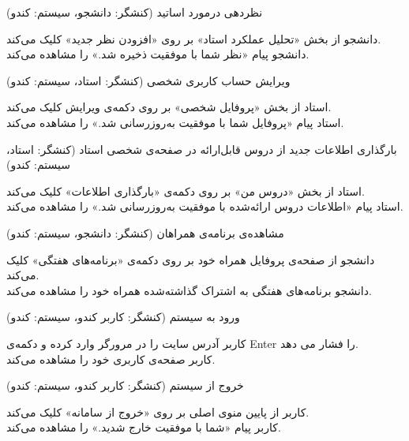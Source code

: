 \documentclass{report}
\begin{document}
\textbf{}
نظردهی درمورد اساتید (کنشگر: دانشجو، سیستم: کندو)
\begin{addmargin}[.84cm]{0cm}
دانشجو از بخش «تحلیل عملکرد استاد» بر روی «افزودن نظر جدید» کلیک می‌کند.\\
دانشجو پیام «نظر شما با موفقیت ذخیره شد.» را مشاهده می‌کند.
\end{addmargin}

\textbf{}
ویرایش حساب کاربری شخصی (کنشگر: استاد، سیستم: کندو)
\begin{addmargin}[.84cm]{0cm}
استاد از بخش «پروفایل شخصی» بر روی دکمه‌ی ویرایش کلیک می‌کند.\\
استاد پیام «پروفایل شما با موفقیت به‌روزرسانی شد.» را مشاهده می‌کند.
\end{addmargin}

\textbf{}
بارگذاری اطلاعات جدید از دروس قابل‌ارائه در صفحه‌ی شخصی استاد (کنشگر: استاد، سیستم: کندو)\begin{addmargin}[.84cm]{0cm}
استاد از بخش «دروس من» بر روی دکمه‌ی «بارگذاری اطلاعات» کلیک می‌کند.\\
استاد پیام «اطلاعات دروس ارائه‌‌شده با موفقیت به‌روزرسانی شد.» را مشاهده می‌کند.
\end{addmargin}

\textbf{}
مشاهده‌ی برنامه‌ی همراهان (کنشگر: دانشجو، سیستم: کندو)
\begin{addmargin}[.84cm]{0cm}
دانشجو از صفحه‌ی پروفایل همراه خود بر روی دکمه‌ی «برنامه‌های هفتگی» کلیک می‌کند.\\
دانشجو برنامه‌های هفتگی به اشتراک گذاشته‌شده همراه خود را مشاهده می‌کند.
\end{addmargin}

\textbf{}
ورود به سیستم (کنشگر: کاربر کندو، سیستم: کندو)\begin{addmargin}[.84cm]{0cm}
کاربر آدرس سایت را در مرورگر وارد کرده و دکمه‌ی Enter را فشار می دهد. \\
کاربر صفحه‌ی کاربری خود را مشاهده می‌کند.
\end{addmargin}

\textbf{}
خروج از سیستم (کنشگر: کاربر کندو، سیستم: کندو)\begin{addmargin}[.84cm]{0cm}
کاربر از پایین منوی اصلی بر روی «خروج از سامانه» کلیک می‌کند.\\
کاربر پیام «شما با موفقیت خارج شدید.» را مشاهده می‌کند.
\end{addmargin}
\end{document}

